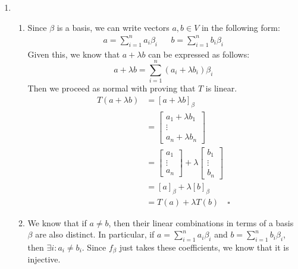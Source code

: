 \documentclass[12pt]{article}
\begin{document}
\begin{enumerate}
      \item \begin{enumerate}
                  \item Since $\beta$ is a basis, we can write vectors $a, b \in V$ in the following form:
                        \begin{align*}
                              a=\sum_{i=1}^{n} a_i \beta_i &  & b=\sum_{i=1}^{n} b_i \beta_i
                        \end{align*}
                        Given this, we know that $a+\lambda b$ can be expressed as follows:
                        \[a+\lambda b=\sum_{i=1}^{n} (a_i+\lambda b_i) \beta_i\]
                        Then we proceed as normal with proving that $T$ is linear.
                        \begin{align*}
                              T(a+\lambda b) & =[a+\lambda b]_\beta            \\
                                             & =\begin{bmatrix}
                                                      a_1+\lambda b_1 \\
                                                      \vdots          \\
                                                      a_n+\lambda b_n
                                                \end{bmatrix}                \\
                                             & = \begin{bmatrix}
                                                       a_1    \\
                                                       \vdots \\
                                                       a_n
                                                 \end{bmatrix} +\lambda
                              \begin{bmatrix}
                                    b_1    \\
                                    \vdots \\
                                    b_n
                              \end{bmatrix}                                   \\
                                             & = [a]_\beta+\lambda [b]_\beta   \\
                                             & = T(a)+\lambda T(b)\quad\square
                        \end{align*}
                  \item We know that if $a \ne b$, then their linear combinations in terms of a basis $\beta$ are also distinct.
                        In particular, if $a =\sum_{i=1}^{n} a_i \beta_i$ and $b=\sum_{i=1}^{n} b_i \beta_i$, then $\exists i: a_i \ne b_i$.
                        Since $f_\beta$ just takes these coefficients, we know that it is injective.


\end{enumerate}
\end{enumerate}
\end{document}
